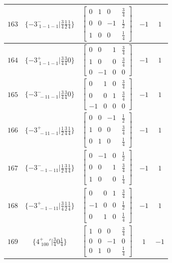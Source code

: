\documentclass[fleqn,8pt]{jsarticle}
\begin{document}
\begin{longtable}{ccccc}
$ 163 $ & $ \{-3^{-}_{\,\,1-1-1}|\frac{3}{4} \frac{1}{2} \frac{1}{4}\} $ & $ \begin{bmatrix} 0 & 1 & 0 & \frac{3}{4} \\ 0 & 0 & -1 & \frac{1}{2} \\ 1 & 0 & 0 & \frac{1}{4} \end{bmatrix} $ & $ -1 $ & $ 1 $ \\ \hline
$ 164 $ & $ \{-3^{+}_{\,\,1-1-1}|\frac{3}{4} \frac{3}{4} 0\} $ & $ \begin{bmatrix} 0 & 0 & 1 & \frac{3}{4} \\ 1 & 0 & 0 & \frac{3}{4} \\ 0 & -1 & 0 & 0 \end{bmatrix} $ & $ -1 $ & $ 1 $ \\ \hline
$ 165 $ & $ \{-3^{-}_{\,\,-11-1}|\frac{3}{4} \frac{3}{4} 0\} $ & $ \begin{bmatrix} 0 & 1 & 0 & \frac{3}{4} \\ 0 & 0 & 1 & \frac{3}{4} \\ -1 & 0 & 0 & 0 \end{bmatrix} $ & $ -1 $ & $ 1 $ \\ \hline
$ 166 $ & $ \{-3^{+}_{\,\,-11-1}|\frac{1}{2} \frac{3}{4} \frac{1}{4}\} $ & $ \begin{bmatrix} 0 & 0 & -1 & \frac{1}{2} \\ 1 & 0 & 0 & \frac{3}{4} \\ 0 & 1 & 0 & \frac{1}{4} \end{bmatrix} $ & $ -1 $ & $ 1 $ \\ \hline
$ 167 $ & $ \{-3^{-}_{\,\,-1-11}|\frac{1}{2} \frac{3}{4} \frac{1}{4}\} $ & $ \begin{bmatrix} 0 & -1 & 0 & \frac{1}{2} \\ 0 & 0 & 1 & \frac{3}{4} \\ 1 & 0 & 0 & \frac{1}{4} \end{bmatrix} $ & $ -1 $ & $ 1 $ \\ \hline
$ 168 $ & $ \{-3^{+}_{\,\,-1-11}|\frac{3}{4} \frac{1}{2} \frac{1}{4}\} $ & $ \begin{bmatrix} 0 & 0 & 1 & \frac{3}{4} \\ -1 & 0 & 0 & \frac{1}{2} \\ 0 & 1 & 0 & \frac{1}{4} \end{bmatrix} $ & $ -1 $ & $ 1 $ \\ \hline
$ 169 $ & $ \{4^{+}_{\,\,100}{}'|\frac{3}{4} 0 \frac{1}{4}\} $ & $ \begin{bmatrix} 1 & 0 & 0 & \frac{3}{4} \\ 0 & 0 & -1 & 0 \\ 0 & 1 & 0 & \frac{1}{4} \end{bmatrix} $ & $ 1 $ & $ -1 $ \\ \hline

\end{longtable}
\end{document}
